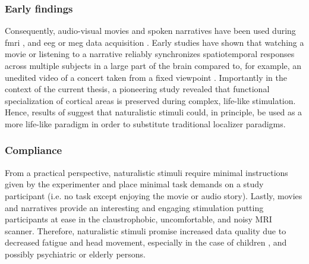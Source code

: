 \subsubsection{Early findings}
Consequently, audio-visual movies and spoken narratives have been used during
\ac{fmri} \citep[cf.][for reviews]{hamilton2018revolution,
hasson2008neurocinematics, sonkusare2019naturalistic,
saarimaki2021naturalistic}, and \ac{eeg} or \ac{meg} data acquisition
\citep[s.][for reviews]{alday2019meg, kandylaki2019story}.
Early studies have shown that watching a movie \citep{hasson2004intersubject,
hasson2008neurocinematics, hasson2010reliability} or listening to a narrative
\citep{lerner2011topographic, wilson2008beyond} reliably synchronizes
spatiotemporal responses across multiple subjects in a large part of the brain
compared to, for example, an unedited video of a concert taken from a fixed
viewpoint \citep{hasson2004intersubject, hasson2008neurocinematics,
hasson2010reliability, lerner2011topographic, wilson2008beyond}.
Importantly in the context of the current thesis, a pioneering study
\citep{bartels2004mapping} revealed that functional specialization of cortical
areas is preserved during complex, life-like stimulation.
Hence, results of \citet{bartels2004mapping} suggest that naturalistic stimuli
could, in principle, be used as a more life-like paradigm in order to substitute
traditional localizer paradigms.


\subsubsection{Compliance}

From a practical perspective, naturalistic stimuli require minimal instructions
given by the experimenter and place minimal task demands on a study participant
(i.e.  no task except enjoying the movie or audio story).
%
Lastly, movies and narratives provide an interesting and engaging stimulation
putting participants at ease in the claustrophobic, uncomfortable, and noisy MRI
scanner.
%
Therefore, naturalistic stimuli promise increased data quality due to decreased
fatigue and head movement, especially in the case of children
\citep{vanderwal2015inscapes}, and possibly psychiatric
\citep{eickhoff2020towards} or elderly persons.


